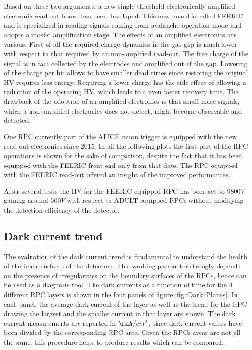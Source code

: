 Based on these two arguments, a new single threshold electronically amplified electronic read-out board has been developed.
This new board is called FEERIC and is specialized in reading signals coming from avalanche operation mode and adopts a mosfet amplification stage.
The effects of an amplified electronics are various.
First of all the required charge dynamics in the gas gap is much lower with respect to that required by an non-amplified read-out.
The free charge of the signal is in fact collected by the electrodes and amplified out of the gap.
Lowering of the charge per hit allows to have smaller dead times since restoring the original HV requires less energy.
Requiring a lower charge has the side effect of allowing a reduction of the operating HV, which leads to a even faster recovery time.
The drawback of the adoption of an amplified electronics is that small noise signals, which a non-amplified electronics does not detect, might become observable and detected.

One RPC currently part of the ALICE muon trigger is equipped with the new read-out electronics since 2015.
In all the following plots the first part of the RPC operations is shown for the sake of comparison, despite the fact that it has been equipped with the FEERIC front end only from that date.
The RPC equipped with the FEERIC read-out offered an insight of the improved performances.

After several tests the HV for the FEERIC equipped RPC has been set to $9800V$ gaining around $500V$ with respect to ADULT-equipped RPCs without modifying the detection efficiency of the detector.

\subsection{Dark current trend}
The evaluation of the dark current trend is fundamental to understand the health of the inner surfaces of the detectors.
This working parameter strongly depends on the presence of irregularities on the boundary surfaces of the RPCs, hence can be used as a diagnosis tool.
The dark currents as a function of time for the 4 different RPC layers is shown in the four panels of figure \ref{fig:iDark4Planes}. 
In each panel, the average dark current of the layer as well as the trend for the RPC drawing the largest and the smaller current in that layer are shown.
The dark current measurements are reported in $\muA/cm^2$, since dark current values have been divided by the corresponding RPC area.
Given the RPCs areas are not all the same, this procedure helps to produce results which can be compared.

